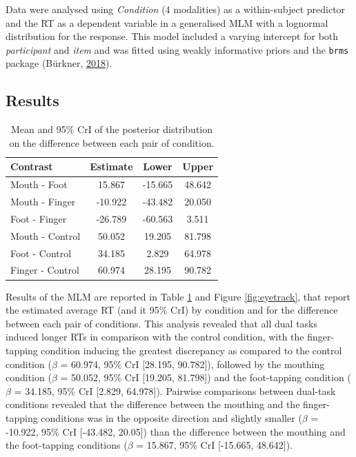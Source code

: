 \documentclass[a4paper,12pt,twoside,openright,oldfontcommands]{memoir}
\begin{document}
Data were analysed using \emph{Condition} (4 modalities) as a within-subject predictor and the RT as a dependent variable in a generalised MLM with a lognormal distribution for the response. This model included a varying intercept for both \emph{participant} and \emph{item} and was fitted using weakly informative priors and the \texttt{brms} package (Bürkner, \protect\hyperlink{ref-R-brms}{2018}).

\hypertarget{results-4}{%
\subsection{Results}\label{results-4}}

\begin{table}[H]
\begin{center}
\begin{threeparttable}
\caption{\label{tab:RTestimates}Mean and 95\% CrI of the posterior distribution on the difference between each pair of condition.}
\small{
\begin{tabular}{lccc}
\toprule
Contrast & \multicolumn{1}{c}{Estimate} & \multicolumn{1}{c}{Lower} & \multicolumn{1}{c}{Upper}\\
\midrule
Mouth - Foot & 15.867 & -15.665 & 48.642\\
Mouth - Finger & -10.922 & -43.482 & 20.050\\
Foot - Finger & -26.789 & -60.563 & 3.511\\
Mouth - Control & 50.052 & 19.205 & 81.798\\
Foot - Control & 34.185 & 2.829 & 64.978\\
Finger - Control & 60.974 & 28.195 & 90.782\\
\bottomrule
\end{tabular}
}
\end{threeparttable}
\end{center}
\end{table}

Results of the MLM are reported in Table \ref{tab:RTestimates} and Figure \ref{fig:eyetrack}, that report the estimated average RT (and it 95\% CrI) by condition and for the difference between each pair of conditions. This analysis revealed that all dual tasks induced longer RTs in comparison with the control condition, with the finger-tapping condition inducing the greatest discrepancy as compared to the control condition (\(\beta\) = 60.974, 95\% CrI {[}28.195, 90.782{]}), followed by the mouthing condition (\(\beta\) = 50.052, 95\% CrI {[}19.205, 81.798{]}) and the foot-tapping condition (\(\beta\) = 34.185, 95\% CrI {[}2.829, 64.978{]}). Pairwise comparisons between dual-task conditions revealed that the difference between the mouthing and the finger-tapping conditions was in the opposite direction and slightly smaller (\(\beta\) = -10.922, 95\% CrI {[}-43.482, 20.05{]}) than the difference between the mouthing and the foot-tapping conditions (\(\beta\) = 15.867, 95\% CrI {[}-15.665, 48.642{]}).
\end{document}

